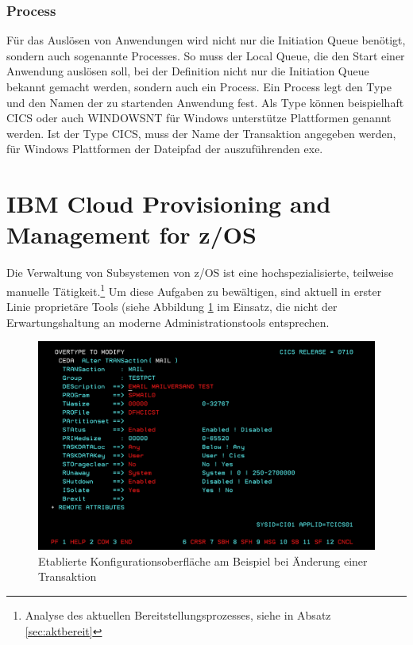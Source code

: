 \subsubsection{Process}
Für das Auslösen von Anwendungen wird nicht nur die Initiation Queue benötigt, sondern auch sogenannte \glqq Processes\grqq.
So muss der Local Queue, die den Start einer Anwendung auslösen soll, bei der Definition nicht nur die Initiation Queue bekannt gemacht werden, sondern auch ein Process.
Ein Process legt den \glqq Type\grqq{} und den Namen der zu startenden Anwendung fest.
Als \glqq Type\grqq{} können beispielhaft CICS oder auch WINDOWSNT für Windows unterstütze Plattformen genannt werden.
Ist der \glqq Type\grqq{} CICS,  muss der Name der Transaktion angegeben werden, für Windows Plattformen der Dateipfad der auszuführenden exe.
\cite[Kap. 4.5]{Aranha.2013}

\section{\glqq IBM Cloud Provisioning and Management for z/OS\grqq}\label{sec:tool}
Die Verwaltung von Subsystemen von z/OS ist eine hochspezialisierte, teilweise manuelle Tätigkeit.\footnote{Analyse des aktuellen Bereitstellungsprozesses, siehe in Absatz \ref{sec:aktbereit}}
Um diese Aufgaben zu bewältigen, sind aktuell in erster Linie proprietäre Tools (siehe Abbildung \ref{fig:configalt} im Einsatz, die nicht der Erwartungshaltung an moderne Administrationstools entsprechen.

\begin{figure}[h]
\centering
\includegraphics[width=\textwidth]{figures/Transaktionbearbeitenalt.PNG}
\caption{Etablierte Konfigurationsoberfläche am Beispiel bei Änderung einer Transaktion}
\label{fig:configalt}
\end{figure}

